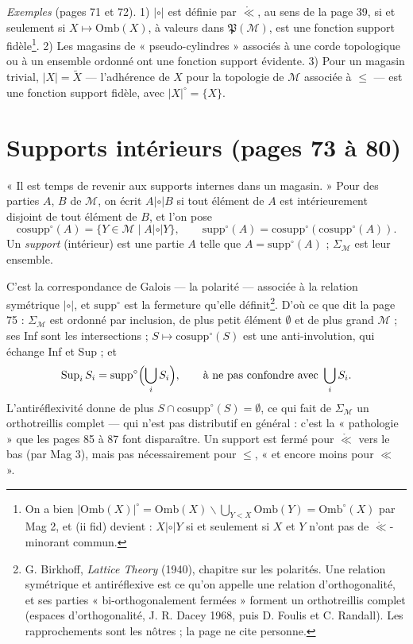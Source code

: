 \documentclass[11pt,a4paper]{article}
\begin{document}
\emph{Exemples} (pages 71 et 72). 1) $\mathrel{|\circ|}$ est définie par
$\mathring{\ll}$, au sens de la page 39, si et seulement si $X \mapsto
\mathrm{Omb}(X)$, à valeurs dans $\mathfrak{P}(\mathcal{M})$, est une fonction
support fidèle\footnote{On a bien $|\mathrm{Omb}(X)|^{\circ} = \mathrm{Omb}(X)
\smallsetminus \bigcup_{Y < X} \mathrm{Omb}(Y) = \mathrm{Omb}^{\circ}(X)$ par
Mag 2, et (ii fid) devient : $X \mathrel{|\circ|} Y$ si et seulement si $X$ et
$Y$ n'ont pas de $\mathring{\ll}$-minorant commun.}. 2) Les magasins de
« pseudo-cylindres » associés à une corde topologique ou à un ensemble ordonné
ont une fonction support évidente. 3) Pour un magasin trivial, $|X| =
\widetilde{X}$ --- l'adhérence de $X$ pour la topologie de $\mathcal{M}$
associée à $\leq$ --- est une fonction support fidèle, avec $|X|^{\circ} =
\{X\}$.

\section*{Supports intérieurs (pages 73 à 80)}

« Il est temps de revenir aux supports internes dans un magasin. » Pour des
parties $A$, $B$ de $\mathcal{M}$, on écrit $A \mathrel{|\circ|} B$ si tout
élément de $A$ est intérieurement disjoint de tout élément de $B$, et l'on pose
\[
\mathrm{cosupp}^{\circ}(A) = \{ Y \in \mathcal{M} \mid A \mathrel{|\circ|} Y
\}, \qquad \mathrm{supp}^{\circ}(A) =
\mathrm{cosupp}^{\circ}(\mathrm{cosupp}^{\circ}(A)).
\]
Un \emph{support} (intérieur) est une partie $A$ telle que $A =
\mathrm{supp}^{\circ}(A)$ ; $\Sigma_{\mathcal{M}}$ est leur ensemble.

C'est la correspondance de Galois --- la polarité --- associée à la relation
symétrique $\mathrel{|\circ|}$, et $\mathrm{supp}^{\circ}$ est la fermeture
qu'elle définit\footnote{G. Birkhoff, \emph{Lattice Theory} (1940), chapitre
sur les polarités. Une relation symétrique et antiréflexive est ce qu'on
appelle une relation d'orthogonalité, et ses parties « bi-orthogonalement
fermées » forment un orthotreillis complet (espaces d'orthogonalité, J. R.
Dacey 1968, puis D. Foulis et C. Randall). Les rapprochements sont les nôtres ;
la page ne cite personne.}. D'où ce que dit la page 75 :
$\Sigma_{\mathcal{M}}$ est ordonné par inclusion, de plus petit élément
$\emptyset$ et de plus grand $\mathcal{M}$ ; ses Inf sont les intersections ;
$S \mapsto \mathrm{cosupp}^{\circ}(S)$ est une anti-involution, qui échange Inf
et Sup ; et
\[
\mathrm{Sup}_{i}\, S_{i} = \mathrm{supp}^{\circ}\Bigl(\bigcup_{i}
S_{i}\Bigr), \qquad \text{à ne pas confondre avec } \bigcup_{i} S_{i}.
\]
L'antiréflexivité donne de plus $S \cap \mathrm{cosupp}^{\circ}(S) =
\emptyset$, ce qui fait de $\Sigma_{\mathcal{M}}$ un orthotreillis complet ---
qui n'est pas distributif en général : c'est la « pathologie » que les pages 85
à 87 font disparaître. Un support est fermé pour $\mathring{\ll}$ vers le bas
(par Mag 3), mais pas nécessairement pour $\leq$, « et encore moins pour
$\ll$ ».
\end{document}
